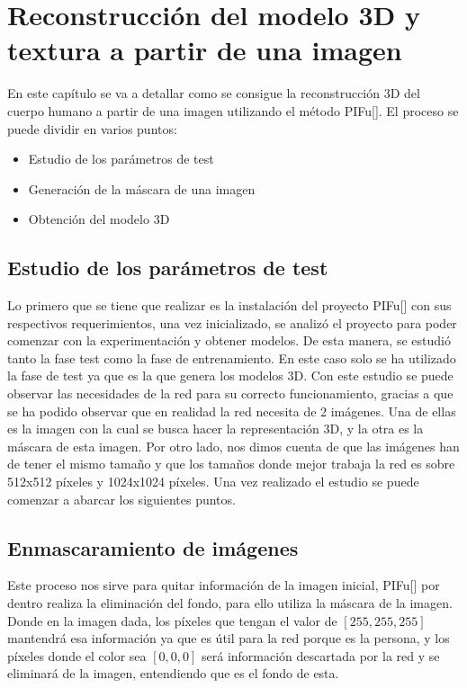 \chapter{Reconstrucción del modelo 3D y textura a partir de una imagen}
\label{Reconstrucción}
En este capítulo se va a detallar como se consigue la reconstrucción 3D del cuerpo humano a partir de una imagen utilizando el método PIFu[\cite{pifu}]. El proceso se puede dividir en varios puntos:

\begin{itemize}
	\item Estudio de los parámetros de test
	\item Generación de la máscara de una imagen
	\item Obtención del modelo 3D
\end{itemize}

\section{Estudio de los parámetros de test}

Lo primero que se tiene que realizar es la instalación del proyecto PIFu[\cite{pifu}] con sus respectivos requerimientos, una vez inicializado, se analizó el proyecto para poder comenzar con la experimentación y obtener modelos. 
De esta manera, se estudió tanto la fase test como la fase de entrenamiento. En este caso solo se ha utilizado la fase de test ya que es la que genera los modelos 3D. Con este estudio se puede observar las necesidades de la red para su correcto funcionamiento, gracias a que se ha podido observar que en realidad la red necesita de 2 imágenes. Una de ellas es la imagen con la cual se busca hacer la representación 3D, y la otra es la máscara de esta imagen. Por otro lado, nos dimos cuenta de que las imágenes han de tener el mismo tamaño y que los tamaños donde mejor trabaja la red es sobre 512x512 píxeles y 1024x1024 píxeles. 
Una vez realizado el estudio se puede comenzar a abarcar los siguientes puntos.

\section{Enmascaramiento de imágenes}

Este proceso nos sirve para quitar información de la imagen inicial, PIFu[\cite{pifu}] por dentro realiza la eliminación del fondo, para ello utiliza la máscara de la imagen. Donde en la imagen dada, los píxeles que tengan el valor de $[255,255,255]$ mantendrá esa información ya que es útil para la red porque es la persona, y los píxeles donde el color sea $[0,0,0]$ será información descartada por la red y se eliminará de la imagen, entendiendo que es el fondo de esta.

